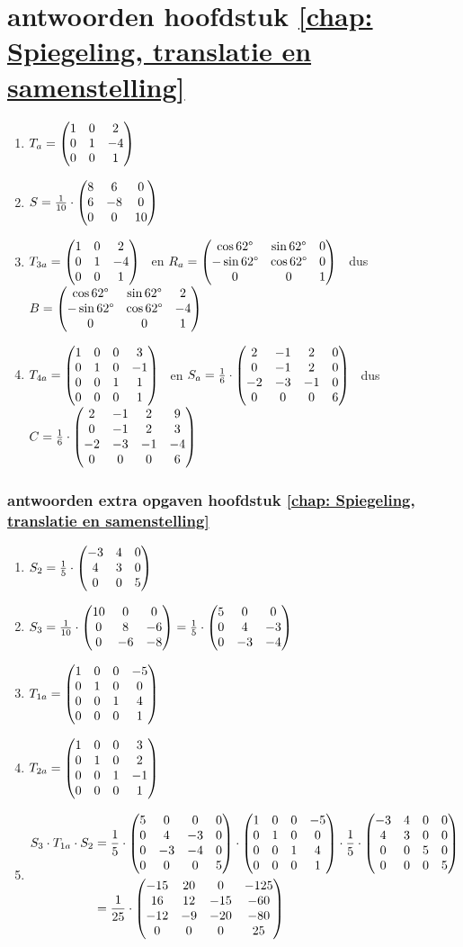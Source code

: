 \section{antwoorden  hoofdstuk \ref{chap: Spiegeling, translatie en samenstelling}}
\begin{enumerate}
	\item $ T_a = \begin{pmatrix} 1&0&2 \\ 0&1&-4 \\ 0&0&1 \end{pmatrix} $ 
	
	\item $   S = \frac{1}{10} \cdot\begin{pmatrix} 8&6&0 \\ 6&-8&0 \\ 0&0&10 \end{pmatrix}  $ 
	
	\item $ T_{3a} = \begin{pmatrix} 1&0&2 \\ 0&1&-4 \\ 0&0&1 \end{pmatrix} $ 
	\ en $ R_a= \begin{pmatrix} \cos 62 \degree &\sin 62 \degree&0 \\ -\sin 62 \degree&\cos 62 \degree&0 \\ 0&0&1 \end{pmatrix} $ 
	\ dus $ B= \begin{pmatrix} \cos 62 \degree &\sin 62 \degree&2 \\ -\sin 62 \degree&\cos 62 \degree&-4 \\ 0&0&1 \end{pmatrix} $ 
	
	
	\item $ T_{4a} = \begin{pmatrix} 1&0&0&3 \\ 0&1&0&-1 \\ 0&0&1&1 \\ 0&0&0&1 \end{pmatrix} $
	\ en $ S_a= \frac{1}{6}\cdot\begin{pmatrix} 2&-1&2&0 \\ 0&-1&2&0 \\ -2&-3&-1&0 \\ 0&0&0&6 \end{pmatrix} $
	\ dus $ C = \frac{1}{6}\cdot \begin{pmatrix} 2&-1&2&9 \\ 0&-1&2&3 \\ -2&-3&-1&-4 \\ 0&0&0&6 \end{pmatrix} $
	
	
\end{enumerate}

\subsubsection{antwoorden extra opgaven hoofdstuk \ref{chap: Spiegeling, translatie en samenstelling}}
\begin{enumerate}
	\item $   S_2 = \frac{1}{5} \cdot\begin{pmatrix} -3&4&0 \\ 4&3&0 \\ 0&0&5 \end{pmatrix}  $ 
	\item $   S_3 = \frac{1}{10} \cdot\begin{pmatrix} 10&0&0 \\ 0&8&-6 \\ 0&-6&-8 \end{pmatrix}  
	= \frac{1}{5} \cdot \begin{pmatrix} 5&0&0 \\ 0&4&-3 \\ 0&-3&-4 \end{pmatrix}  $ 
	
	\item $T_{1a} = \begin{pmatrix} 1&0&0&-5 \\ 0&1&0&0 \\ 0&0&1&4 \\ 0&0&0&1 \end{pmatrix} $
    	\item $ T_{2a} = \begin{pmatrix} 1&0&0&3 \\ 0&1&0&2 \\ 0&0&1&-1 \\ 0&0&0&1 \end{pmatrix} $
    	\item 
        \begin{align*}
            S_3 \cdot T_{1a} \cdot S_2 &= \frac{1}{5} \cdot
            \begin{pmatrix} 5&0&0&0 \\ 0&4&-3&0 \\ 0&-3&-4&0 \\ 0&0&0&5 \end{pmatrix} \cdot 
        	\begin{pmatrix} 1&0&0&-5 \\ 0&1&0&0 \\ 0&0&1&4 \\ 0&0&0&1 \end{pmatrix} \cdot 
        	\frac{1}{5} \cdot \begin{pmatrix} -3&4&0&0 \\ 4&3&0&0 \\ 0&0&5&0 \\ 0&0&0&5 \end{pmatrix} \\
        	&= \frac{1}{25} \cdot \begin{pmatrix} -15&20&0&-125 \\ 16&12&-15&-60 \\ -12&-9&-20&-80 \\ 0&0&0&25 \end{pmatrix} 
    	\end{align*}
	
\end{enumerate}

